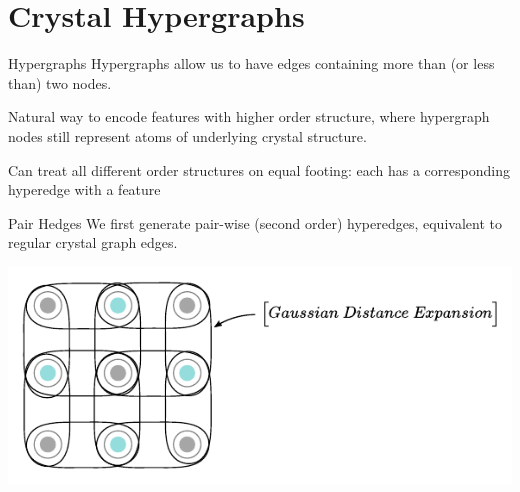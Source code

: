 \documentclass[11pt]{beamer}
\begin{document}
\section{Crystal Hypergraphs}
\begin{frame}{Hypergraphs}
Hypergraphs allow us to have edges containing more than (or less than) two nodes.

\vspace{.5cm}

Natural way to encode features with higher order structure, where hypergraph nodes still represent atoms of underlying crystal structure.

\vspace{.5cm}

Can treat all different order structures on equal footing: each has a corresponding hyperedge with a feature
\end{frame}





\begin{frame}{Pair Hedges}
We first generate pair-wise (second order) hyperedges, equivalent to regular crystal graph edges.

\vspace{0.5cm}

\begin{center}
\includegraphics[scale=0.73]{pair.pdf}
\end{center}

\end{frame}
\end{document}
